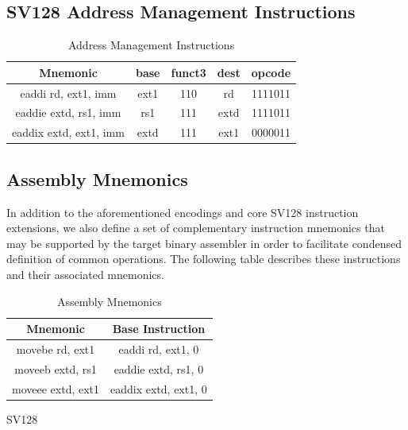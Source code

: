 \documentclass{article}
\begin{document}
\newpage
\subsection{SV128 Address Management Instructions}

\begin{center}
\begin{small}

\begin{table}[H]
\caption{Address Management Instructions}
\begin{center}
\begin{tabular}{| c | c | c | c | c | }
\hline
Mnemonic & base & funct3 & dest & opcode \\ \hline
\hline
eaddi rd, ext1, imm & ext1 & 110 & rd & 1111011\\
\hline
eaddie extd, rs1, imm & rs1 &111 & extd & 1111011\\
\hline
eaddix extd, ext1, imm & extd & 111 & ext1 & 0000011\\
\hline
\end{tabular}
\end{center}
\end{table}

\end{small}
\end{center}

\subsection{Assembly Mnemonics}

In addition to the aforementioned encodings and core SV128 
instruction extensions, we also define a set of complementary 
instruction mnemonics that may be supported by the target 
binary assembler in order to facilitate condensed definition 
of common operations.  The following table describes 
these instructions and their associated mnemonics.  

\begin{center}
\begin{small}

\begin{table}[H]
\caption{Assembly Mnemonics}
\begin{center}
\begin{tabular}{| c | c |}
\hline
Mnemonic & Base Instruction\\ \hline
\hline
movebe rd, ext1 & eaddi rd, ext1, 0\\
\hline
moveeb extd, rs1 & eaddie extd, rs1, 0\\
\hline
moveee extd, ext1 & eaddix extd, ext1, 0\\
\hline
\end{tabular}
\end{center}
\end{table}

\end{small}
\end{center}SV128
\end{document}
